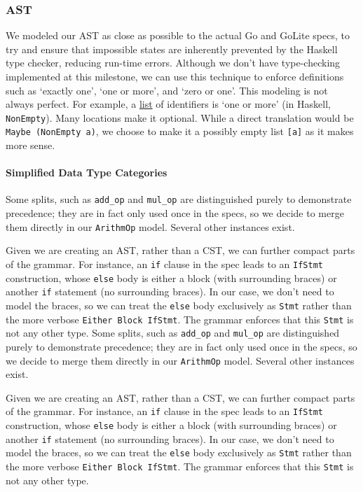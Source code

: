 \documentclass[11pt]{article}
\begin{document}
\subsubsection{AST}
We modeled our AST as close as possible to the actual Go and
GoLite specs, to try and ensure that impossible states are inherently
prevented by the Haskell type checker, reducing run-time errors.
Although we don't have type-checking implemented at this milestone,
we can use this technique to enforce definitions such as
`exactly one', `one or more', and `zero or one'. This modeling is
not always perfect. For example, a \href{https://golang.org/ref/spec\#IdentifierList}{list}
of identifiers is `one or more' (in Haskell, \texttt{NonEmpty}). Many locations
make it optional. While a direct translation would be \texttt{Maybe (NonEmpty a)},
we choose to make it a possibly empty list \texttt{[a]} as it makes more sense.
\paragraph{Simplified Data Type Categories}
Some splits, such as \texttt{add\_op} and \texttt{mul\_op} are distinguished
purely to demonstrate precedence; they are in fact only used once
in the specs, so we decide to merge them directly in our \texttt{ArithmOp}
model. Several other instances exist.

Given we are creating an AST, rather than a CST, we can further
compact parts of the grammar. For instance, an \texttt{if} clause in the
spec leads to an \texttt{IfStmt} construction, whose \texttt{else} body is either
a block (with surrounding braces) or another \texttt{if} statement (no
surrounding braces). In our case, we don't need to model the braces,
so we can treat the \texttt{else} body exclusively as \texttt{Stmt} rather than
the more verbose \texttt{Either Block IfStmt}. The grammar enforces that
this \texttt{Stmt} is not any other type.
Some splits, such as \texttt{add\_op} and \texttt{mul\_op} are distinguished
purely to demonstrate precedence; they are in fact only used once
in the specs, so we decide to merge them directly in our \texttt{ArithmOp}
model. Several other instances exist.

Given we are creating an AST, rather than a CST, we can further
compact parts of the grammar. For instance, an \texttt{if} clause in the
spec leads to an \texttt{IfStmt} construction, whose \texttt{else} body is either
a block (with surrounding braces) or another \texttt{if} statement (no
surrounding braces). In our case, we don't need to model the braces,
so we can treat the \texttt{else} body exclusively as \texttt{Stmt} rather than
the more verbose \texttt{Either Block IfStmt}. The grammar enforces that
this \texttt{Stmt} is not any other type.
\end{document}
